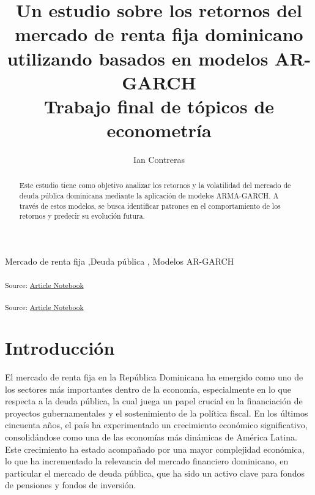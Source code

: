 \documentclass[
  number,
  preprint,
  3p,
  onecolumn]{elsarticle}
\begin{document}
\begin{frontmatter}
\title{Un estudio sobre los retornos del mercado de renta fija
dominicano utilizando basados en modelos AR-GARCH \\\large{Trabajo final
de tópicos de econometría} }
\author[1]{Ian Contreras%
%
}



        
\begin{abstract}
Este estudio tiene como objetivo analizar los retornos y la volatilidad
del mercado de deuda pública dominicana mediante la aplicación de
modelos ARMA-GARCH. A través de estos modelos, se busca identificar
patrones en el comportamiento de los retornos y predecir su evolución
futura.
\end{abstract}





\begin{keyword}
    Mercado de renta fija \sep Deuda pública \sep 
    Modelos AR-GARCH
\end{keyword}
\end{frontmatter}
    

\label{importing-libraries}
\textsubscript{Source:
\href{https://iancont.github.io/fixed_income_garch/index-preview.html}{Article
Notebook}}

\label{importing-data}
\textsubscript{Source:
\href{https://iancont.github.io/fixed_income_garch/index-preview.html}{Article
Notebook}}

\section{Introducción}\label{introducciuxf3n}

El mercado de renta fija en la República Dominicana ha emergido como uno
de los sectores más importantes dentro de la economía, especialmente en
lo que respecta a la deuda pública, la cual juega un papel crucial en la
financiación de proyectos gubernamentales y el sostenimiento de la
política fiscal. En los últimos cincuenta años, el país ha experimentado
un crecimiento económico significativo, consolidándose como una de las
economías más dinámicas de América Latina. Este crecimiento ha estado
acompañado por una mayor complejidad económica, lo que ha incrementado
la relevancia del mercado financiero dominicano, en particular el
mercado de deuda pública, que ha sido un activo clave para fondos de
pensiones y fondos de inversión.
\end{document}
